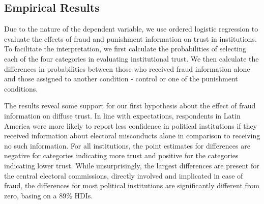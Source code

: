 \documentclass[11pt, ngerman,english,a4]{article}
\begin{document}
\subsection*{Empirical Results}

\vspace{1cm}


Due to the nature of the dependent variable, we use ordered logistic regression to evaluate the effects of fraud and punishment information on trust in institutions. To facilitate the interpretation, we first calculate the probabilities of selecting each of the four categories in evaluating institutional trust. We then calculate the differences in probabilities between those who received fraud information alone and those assigned to another condition - control or one of the punishment conditions.  

The results reveal some support for our first hypothesis about the effect of fraud information on diffuse trust. In line with expectations, respondents in Latin America were more likely to report less confidence in political institutions if they received information about electoral misconducts alone in comparison to receiving no such information. For all institutions, the point estimates for differences are negative for categories indicating more trust and positive for the categories indicating lower trust. While unsurprisingly, the largest differences are present for the central electoral commissions, directly involved and implicated in case of fraud, the differences for most political institutions are significantly different from zero, basing on a 89\% HDIs. 



\end{document}
